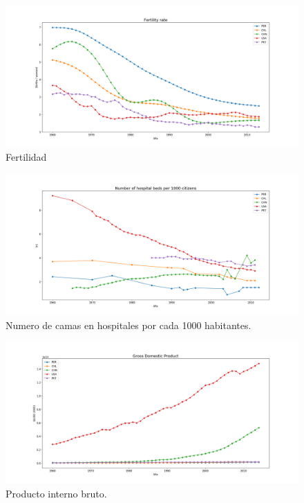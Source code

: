 \documentclass{article}
\begin{document}
\begin{figure}
	\centering
	\includegraphics[scale=0.38]{images/figure_1-2.png}
	\caption{Fertilidad}
	\label{fig:4}
\end{figure}

\begin{figure}
	\centering
	\includegraphics[scale=0.38]{images/figure_1-3.png}
	\caption{Numero de camas en hospitales por cada 1000 habitantes.}
	\label{fig:5}
\end{figure}

\begin{figure}
	\centering
	\includegraphics[scale=0.38]{images/figure_1-4.png}
	\caption{Producto interno bruto.}
	\label{fig:6}
\end{figure}
\end{document}
